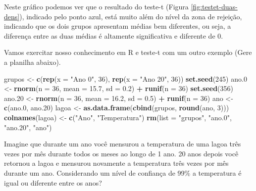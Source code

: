 \documentclass[titlepage, oneside, openany, a4paper]{book}
\newenvironment{Shaded}{\begin{snugshade}}{\end{snugshade}}
\newcommand{\DataTypeTok}[1]{\textcolor[rgb]{0.13,0.29,0.53}{#1}}
\newcommand{\DecValTok}[1]{\textcolor[rgb]{0.00,0.00,0.81}{#1}}
\newcommand{\FloatTok}[1]{\textcolor[rgb]{0.00,0.00,0.81}{#1}}
\newcommand{\KeywordTok}[1]{\textcolor[rgb]{0.13,0.29,0.53}{\textbf{#1}}}
\newcommand{\NormalTok}[1]{#1}
\newcommand{\OperatorTok}[1]{\textcolor[rgb]{0.81,0.36,0.00}{\textbf{#1}}}
\newcommand{\StringTok}[1]{\textcolor[rgb]{0.31,0.60,0.02}{#1}}
\begin{document}
Neste gráfico podemos ver que o resultado do teste-t (Figura \ref{fig:testet-duas-dens}), indicado pelo ponto azul, está muito além do nível da zona de rejeição, indicando que os dois grupos apresentam médias bem diferentes, ou seja, a diferença entre as duas médias é altamente significativa e diferente de 0.

Vamos exercitar nosso conhecimento em R e teste-t com um outro exemplo (Gere a planilha abaixo).

\begin{Shaded}
\begin{Highlighting}[]
\NormalTok{grupos <-}\StringTok{ }\KeywordTok{c}\NormalTok{(}\KeywordTok{rep}\NormalTok{(}\DataTypeTok{x =} \StringTok{"Ano 0"}\NormalTok{, }\DecValTok{36}\NormalTok{), }\KeywordTok{rep}\NormalTok{(}\DataTypeTok{x =} \StringTok{"Ano 20"}\NormalTok{, }\DecValTok{36}\NormalTok{))}
\KeywordTok{set.seed}\NormalTok{(}\DecValTok{245}\NormalTok{)}
\NormalTok{ano}\FloatTok{.0}\NormalTok{ <-}\StringTok{ }\KeywordTok{rnorm}\NormalTok{(}\DataTypeTok{n =} \DecValTok{36}\NormalTok{, }\DataTypeTok{mean =} \FloatTok{15.7}\NormalTok{, }\DataTypeTok{sd =} \FloatTok{0.2}\NormalTok{) }\OperatorTok{+}\StringTok{ }\KeywordTok{runif}\NormalTok{(}\DataTypeTok{n =} \DecValTok{36}\NormalTok{)}
\KeywordTok{set.seed}\NormalTok{(}\DecValTok{356}\NormalTok{)}
\NormalTok{ano}\FloatTok{.20}\NormalTok{ <-}\StringTok{ }\KeywordTok{rnorm}\NormalTok{(}\DataTypeTok{n =} \DecValTok{36}\NormalTok{, }\DataTypeTok{mean =} \FloatTok{16.2}\NormalTok{, }\DataTypeTok{sd =} \FloatTok{0.5}\NormalTok{) }\OperatorTok{+}\StringTok{ }\KeywordTok{runif}\NormalTok{(}\DataTypeTok{n =} \DecValTok{36}\NormalTok{)}
\NormalTok{ano <-}\StringTok{ }\KeywordTok{c}\NormalTok{(ano}\FloatTok{.0}\NormalTok{, ano}\FloatTok{.20}\NormalTok{)}
\NormalTok{lagoa <-}\StringTok{ }\KeywordTok{as.data.frame}\NormalTok{(}\KeywordTok{cbind}\NormalTok{(grupos, }\KeywordTok{round}\NormalTok{(ano, }\DecValTok{3}\NormalTok{)))}
\KeywordTok{colnames}\NormalTok{(lagoa) <-}\StringTok{ }\KeywordTok{c}\NormalTok{(}\StringTok{"Ano"}\NormalTok{, }\StringTok{"Temperatura"}\NormalTok{)}
\KeywordTok{rm}\NormalTok{(}\DataTypeTok{list =} \StringTok{"grupos"}\NormalTok{, }\StringTok{"ano.0"}\NormalTok{, }\StringTok{"ano.20"}\NormalTok{, }\StringTok{"ano"}\NormalTok{)}
\end{Highlighting}
\end{Shaded}

Imagine que durante um ano você mensurou a temperatura de uma lagoa três vezes por mês durante todos os meses ao longo de 1 ano. 20 anos depois você retornou a lagoa e mensurou novamente a temperatura três vezes por mês durante um ano. Considerando um nível de confiança de 99\% a temperatura é igual ou diferente entre os anos?
\end{document}
